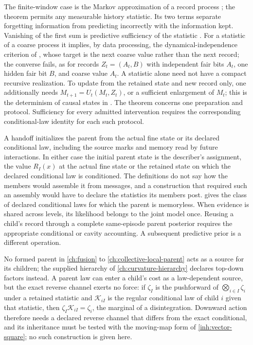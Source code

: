 The finite-window case is the Markov approximation of a record process
\citep[Thm.~7.3.1]{Gray1990}; the theorem permits any measurable history
statistic. Its two terms separate forgetting information from predicting
incorrectly with the information kept. Vanishing of the first sum is
predictive sufficiency of the statistic \citep{ShaliziCrutchfield2001}. For
a statistic of a coarse process it implies, by data processing, the
dynamical-independence criterion of \citet{BarnettSeth2023}, whose target is
the next coarse value rather than the next record; the converse fails, as
for records $Z_t=(A_t,B)$ with independent fair bits $A_t$, one hidden fair
bit $B$, and coarse value $A_t$. A statistic alone need not have
a compact recursive realization. To update from the retained state and
new record only, one additionally needs
$M_{t+1}=U_t(M_t,Z_t)$, or a sufficient enlargement of $M_t$; this is the
determinism of causal states in \citet{ShaliziCrutchfield2001}.
The theorem concerns one preparation and protocol. Sufficiency for
every admitted intervention requires the corresponding conditional-law
identity for each such protocol.

A handoff initializes the parent from the actual fine state or its declared
conditional law, including the source marks and memory read by future
interactions. In either case the initial parent state is the describer's
assignment, the value $R_I(x)$ at the actual fine state or the retained state
on which the declared conditional law is conditioned. The definitions do not
say how the members would assemble it from messages, and a construction that
required such an assembly would have to declare the statistics its members
post.  gives the class of declared
conditional laws for which the parent is memoryless. When evidence is shared
across levels, its likelihood belongs to the joint model once. Reusing a
child's record through a complete same-episode parent posterior requires the
appropriate conditional or cavity accounting. A subsequent predictive prior
is a different operation.

No formed parent in \cref{ch:fusion} to \cref{ch:collective-local-parent}
acts as a source for its children; the supplied hierarchy of
\cref{ch:curvature-hierarchy} declares top-down factors instead. A
parent law can enter a child's cost as a law-dependent source, but the exact
reverse channel exerts no force: if $\zeta_I$ is the pushforward of
$\bigotimes_{i\in I}\zeta_i$ under a retained statistic and
$\mathcal K_{iI}$ is the regular conditional law of child $i$ given that
statistic, then $\zeta_I\mathcal K_{iI}=\zeta_i$, the marginal of a
disintegration. Downward action therefore needs a declared reverse channel
that differs from the exact conditional, and its inheritance must be tested
with the moving-map form of \cref{inh:vector-square}; no such construction
is given here.

